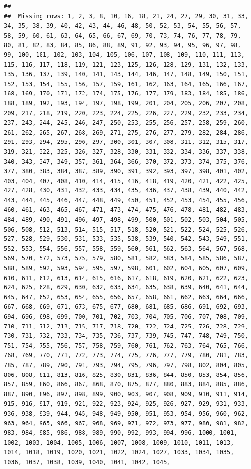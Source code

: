 \documentclass[a4paper, nobind]{templates/ociamthesis}
\begin{document}
\begin{verbatim}
## 
##  Missing rows: 1, 2, 3, 8, 10, 16, 18, 21, 24, 27, 29, 30, 31, 33, 34, 35, 38, 39, 40, 42, 43, 44, 46, 48, 50, 52, 53, 54, 55, 56, 57, 58, 59, 60, 61, 63, 64, 65, 66, 67, 69, 70, 73, 74, 76, 77, 78, 79, 80, 81, 82, 83, 84, 85, 86, 88, 89, 91, 92, 93, 94, 95, 96, 97, 98, 99, 100, 101, 102, 103, 104, 105, 106, 107, 108, 109, 110, 111, 113, 115, 116, 117, 118, 119, 121, 123, 125, 126, 128, 129, 131, 132, 133, 135, 136, 137, 139, 140, 141, 143, 144, 146, 147, 148, 149, 150, 151, 152, 153, 154, 155, 156, 157, 159, 161, 162, 163, 164, 165, 166, 167, 168, 169, 170, 171, 172, 174, 175, 176, 177, 179, 183, 184, 185, 186, 188, 189, 192, 193, 194, 197, 198, 199, 201, 204, 205, 206, 207, 208, 209, 217, 218, 219, 220, 223, 224, 225, 226, 227, 229, 232, 233, 234, 237, 243, 244, 245, 246, 247, 250, 253, 255, 256, 257, 258, 259, 260, 261, 262, 265, 267, 268, 269, 271, 275, 276, 277, 279, 282, 284, 286, 291, 293, 294, 295, 296, 297, 300, 301, 307, 308, 311, 312, 315, 317, 319, 321, 322, 325, 326, 327, 328, 330, 331, 332, 334, 336, 337, 338, 340, 343, 347, 349, 357, 361, 364, 366, 370, 372, 373, 374, 375, 376, 377, 380, 383, 384, 387, 389, 390, 391, 392, 393, 397, 398, 401, 402, 403, 404, 407, 408, 410, 414, 415, 416, 418, 419, 420, 421, 422, 425, 427, 428, 430, 431, 432, 433, 434, 435, 436, 437, 438, 439, 440, 442, 443, 444, 445, 446, 447, 448, 449, 450, 451, 452, 453, 454, 455, 456, 460, 461, 463, 465, 467, 471, 473, 474, 475, 476, 478, 481, 482, 483, 484, 489, 490, 491, 496, 497, 498, 499, 500, 501, 502, 503, 504, 505, 506, 508, 512, 513, 514, 515, 517, 518, 520, 521, 522, 524, 525, 526, 527, 528, 529, 530, 531, 533, 535, 538, 539, 540, 542, 543, 549, 551, 552, 553, 554, 556, 557, 558, 559, 560, 561, 562, 563, 564, 567, 568, 569, 570, 572, 573, 575, 579, 580, 581, 582, 583, 584, 585, 586, 587, 588, 589, 592, 593, 594, 595, 597, 598, 601, 602, 604, 605, 607, 609, 610, 611, 612, 613, 614, 615, 616, 617, 618, 619, 620, 621, 622, 623, 624, 625, 628, 629, 630, 632, 633, 634, 635, 638, 639, 640, 641, 644, 645, 647, 652, 653, 654, 655, 656, 657, 658, 661, 662, 663, 664, 666, 667, 668, 669, 671, 673, 675, 677, 680, 681, 685, 686, 691, 692, 693, 694, 696, 698, 699, 700, 701, 702, 703, 704, 705, 706, 707, 708, 709, 710, 711, 712, 713, 715, 717, 718, 720, 722, 724, 725, 726, 728, 729, 730, 731, 732, 733, 734, 735, 736, 737, 739, 745, 747, 748, 749, 750, 751, 754, 755, 756, 757, 758, 759, 760, 761, 762, 763, 764, 765, 766, 768, 769, 770, 771, 772, 773, 774, 775, 776, 777, 779, 780, 781, 783, 785, 787, 789, 790, 791, 793, 794, 795, 796, 797, 798, 802, 804, 805, 806, 808, 811, 813, 816, 825, 830, 831, 836, 844, 850, 853, 854, 856, 857, 859, 860, 866, 867, 868, 870, 875, 877, 880, 883, 884, 885, 886, 887, 890, 896, 897, 898, 899, 900, 903, 907, 908, 909, 910, 911, 914, 915, 916, 917, 919, 921, 922, 923, 924, 925, 926, 927, 929, 931, 933, 936, 938, 939, 944, 945, 948, 949, 950, 951, 953, 954, 956, 960, 962, 963, 964, 965, 966, 967, 968, 969, 971, 972, 973, 977, 980, 981, 982, 983, 984, 985, 986, 988, 989, 990, 992, 993, 994, 996, 1000, 1001, 1002, 1003, 1004, 1005, 1006, 1007, 1008, 1009, 1010, 1011, 1013, 1014, 1018, 1019, 1020, 1021, 1022, 1024, 1027, 1033, 1034, 1035, 1036, 1037, 1038, 1039, 1040, 1041, 1042, 1045, 
\end{verbatim}
\end{document}
